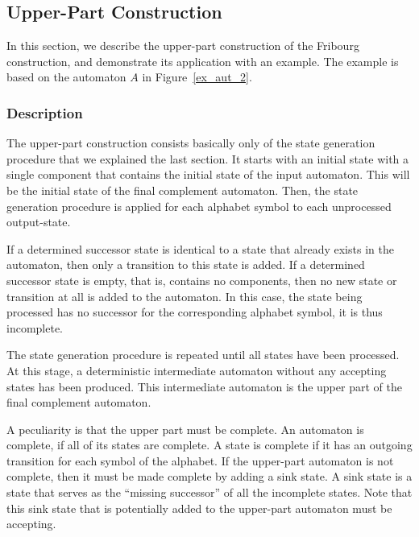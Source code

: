 

\subsection{Upper-Part Construction}
\label{3_upper_part}
In this section, we describe the upper-part construction of the Fribourg construction, and demonstrate its application with an example. The example is based on the automaton $A$ in Figure~\ref{ex_aut_2}.

\subsubsection{Description}
The upper-part construction consists basically only of the state generation procedure that we explained the last section. It starts with an initial state with a single component that contains the initial state of the input automaton. This will be the initial state of the final complement automaton. Then, the state generation procedure is applied for each alphabet symbol to each unprocessed output-state.

If a determined successor state is identical to a state that already exists in the automaton, then only a transition to this state is added. If a determined successor state is empty, that is, contains no components, then no new state or transition at all is added to the automaton. In this case, the state being processed has no successor for the corresponding alphabet symbol, it is thus incomplete.

The state generation procedure is repeated until all states have been processed. At this stage, a deterministic intermediate automaton without any accepting states has been produced. This intermediate automaton is the upper part of the final complement automaton.

A peculiarity is that the upper part must be complete. An automaton is complete, if all of its states are complete. A state is complete if it has an outgoing transition for each symbol of the alphabet. If the upper-part automaton is not complete, then it must be made complete by adding a sink state. A sink state is a state that serves as the ``missing successor'' of all the incomplete states. Note that this sink state that is potentially added to the upper-part automaton must be accepting.

